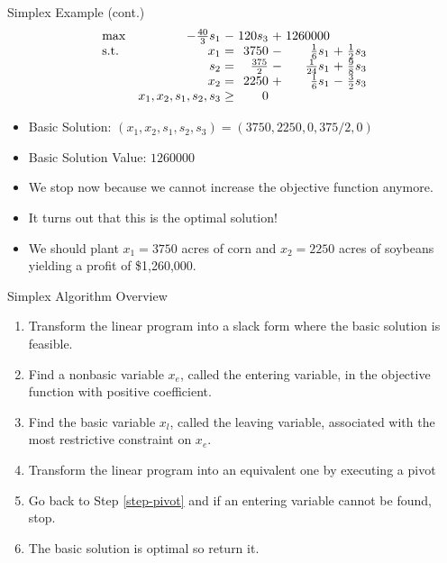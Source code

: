 \documentclass{beamer}
\begin{document}
\begin{frame}{Simplex Example (cont.)}
    \begin{equation*}
    \setlength\arraycolsep{1.5pt}
      \begin{array}{l@{\quad} r c r c r c r}
        \max          & -\frac{40}{3}s_1 & - &         120 s_3 &    +  & 1260000    \\
        \mathrm{s.t.} 
        & x_1 & = & 3750 & - & \frac{1}{6} s_1 & + & \frac{1}{2}s_3 \\
        & s_2 & = & \frac{375}{2} & - & \frac{1}{24}s_1 & + & \frac{9}{8} s_3 \\
        & x_2 & = & 2250 & + & \frac{1}{6}s_1 & - & \frac{3}{2}s_3 \\
        & x_1, x_2, s_1, s_2, s_3 & \geq & 0 &&&&  \\
      \end{array}
    \end{equation*}
    \pause
    \begin{itemize}
        \item<2-> Basic Solution: $(x_1, x_2, s_1, s_2, s_3) = (3750, 2250, 0, 375/2, 0)$
        \item<3-> Basic Solution Value: $1260000$
        \item<4-> We stop now because we cannot increase the objective function anymore.
        \item<5-> It turns out that this is the optimal solution!
        \item<6-> We should plant $x_1=3750$ acres of corn and $x_2=2250$ acres of soybeans yielding a profit of \$1,260,000.
    \end{itemize}
\end{frame}

\begin{frame}{Simplex Algorithm Overview}
    \begin{enumerate}
        \item<1-> Transform the linear program into a slack form where the basic solution is feasible.
        \item<2-> Find a nonbasic variable $x_e$, called the entering variable, in the objective function with positive coefficient. \label{step-pivot}
        \item<3-> Find the basic variable $x_l$, called the leaving variable, associated with the most restrictive constraint on $x_e$.
        \item<4-> Transform the linear program into an equivalent one by executing a pivot
        \item<5-> Go back to Step \ref{step-pivot} and if an entering variable cannot be found, stop.
        \item<6-> The basic solution is optimal so return it.
    \end{enumerate}
\end{frame}
\end{document}
